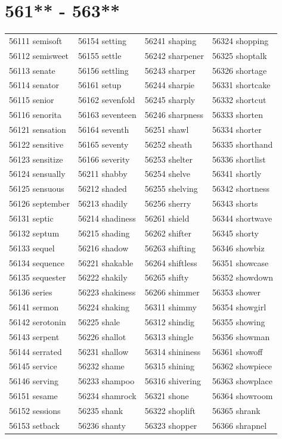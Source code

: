 \documentclass[10pt, oneside]{book}
\begin{document}
\begin{table}
	\centering
	\section*{561** - 563**}
	\begin{tabular}{l l l l}
56111 semisoft &56154 setting &56241 shaping &56324 shopping\\
56112 semisweet &56155 settle &56242 sharpener &56325 shoptalk\\
56113 senate &56156 settling &56243 sharper &56326 shortage\\
56114 senator &56161 setup &56244 sharpie &56331 shortcake\\
56115 senior &56162 sevenfold &56245 sharply &56332 shortcut\\
56116 senorita &56163 seventeen &56246 sharpness &56333 shorten\\
56121 sensation &56164 seventh &56251 shawl &56334 shorter\\
56122 sensitive &56165 seventy &56252 sheath &56335 shorthand\\
56123 sensitize &56166 severity &56253 shelter &56336 shortlist\\
56124 sensually &56211 shabby &56254 shelve &56341 shortly\\
56125 sensuous &56212 shaded &56255 shelving &56342 shortness\\
56126 september &56213 shadily &56256 sherry &56343 shorts\\
56131 septic &56214 shadiness &56261 shield &56344 shortwave\\
56132 septum &56215 shading &56262 shifter &56345 shorty\\
56133 sequel &56216 shadow &56263 shifting &56346 showbiz\\
56134 sequence &56221 shakable &56264 shiftless &56351 showcase\\
56135 sequester &56222 shakily &56265 shifty &56352 showdown\\
56136 series &56223 shakiness &56266 shimmer &56353 shower\\
56141 sermon &56224 shaking &56311 shimmy &56354 showgirl\\
56142 serotonin &56225 shale &56312 shindig &56355 showing\\
56143 serpent &56226 shallot &56313 shingle &56356 showman\\
56144 serrated &56231 shallow &56314 shininess &56361 showoff\\
56145 service &56232 shame &56315 shining &56362 showpiece\\
56146 serving &56233 shampoo &56316 shivering &56363 showplace\\
56151 sesame &56234 shamrock &56321 shone &56364 showroom\\
56152 sessions &56235 shank &56322 shoplift &56365 shrank\\
56153 setback &56236 shanty &56323 shopper &56366 shrapnel\\
	\end{tabular}
 \end{table}
\clearpage
\end{document}
